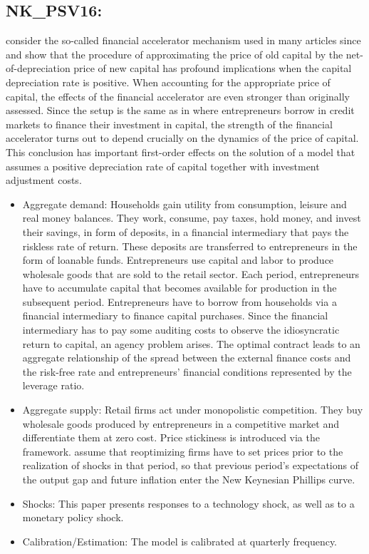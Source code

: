 \documentclass[11pt,a4paper]{article}
\begin{document}
	\subsection{NK\_PSV16: \texorpdfstring{\cite{pancrazi2016price}}{Pancrazi et al. (2016)}}
	\label{NKPSV16}
	\cite{pancrazi2016price} consider the so-called financial accelerator mechanism used in many articles since \cite{BernankeGertlerGilchrist1999} and show that the procedure of approximating the price of old capital by the net-of-depreciation price of new capital has profound implications when the capital depreciation rate is positive. When accounting for the appropriate price of capital, the effects of the financial accelerator are even stronger than originally assessed. Since the setup is the same as in \cite{BernankeGertlerGilchrist1999} where entrepreneurs borrow in credit markets to finance their investment in capital, the strength of the financial accelerator turns out to depend crucially on the dynamics of the price of capital. This conclusion has important first-order effects on the solution of a model that assumes a positive depreciation rate of capital together with investment adjustment costs.
	\begin{itemize}
		\item Aggregate  demand:  Households  gain  utility  from  consumption,  leisure  and  real  money  balances. They work, consume, pay taxes, hold money, and invest their savings, in form of deposits, in a financial intermediary that pays the riskless rate of return. These deposits are transferred to entrepreneurs in the form of loanable funds.  Entrepreneurs  use  capital  and  labor  to  produce  wholesale goods  that  are  sold  to  the  retail  sector.  Each  period,  entrepreneurs  have  to  accumulate  capital  that  becomes available  for  production  in  the  subsequent  period.  Entrepreneurs  have  to  borrow  from  households  via  a  financial intermediary  to  finance  capital  purchases.  Since  the  financial  intermediary  has  to  pay  some  auditing  costs  to observe  the  idiosyncratic  return  to  capital,  an  agency  problem  arises.  The  optimal  contract  leads  to  an  aggregate relationship  of  the  spread  between  the  external  finance  costs  and  the  risk-free  rate  and  entrepreneurs'  financial conditions  represented  by  the  leverage  ratio.
		\item Aggregate  supply:  Retail  firms  act  under  monopolistic  competition.  They  buy  wholesale  goods  produced  by entrepreneurs  in  a  competitive  market  and  differentiate  them  at  zero  cost.  Price  stickiness  is  introduced  via the  \cite{Calvo1983} framework.  \cite{BernankeGertlerGilchrist1999}  assume  that  reoptimizing  firms  have  to  set  prices  prior  to  the realization  of  shocks  in  that  period,  so  that  previous  period's  expectations  of  the  output  gap  and  future  inflation enter  the  New  Keynesian  Phillips  curve.
		\item Shocks:  This  paper  presents responses to  a  technology  shock,  as well as to a monetary  policy  shock. 
		\item Calibration/Estimation:  The  model  is  calibrated  at  quarterly  frequency.
	\end{itemize}
	
\end{document}
